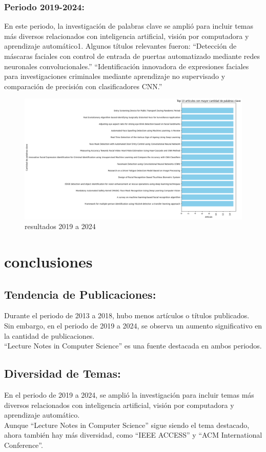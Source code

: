 \documentclass[conference]{IEEEtran}
\begin{document}
\subsubsection{Periodo 2019-2024:}
En este periodo, la investigación de palabras clave se amplió para incluir temas más diversos relacionados con inteligencia artificial, visión por computadora y aprendizaje automático1.
Algunos títulos relevantes fueron:
“Detección de máscaras faciales con control de entrada de puertas automatizado mediante redes neuronales convolucionales.”
“Identificación innovadora de expresiones faciales para investigaciones criminales mediante aprendizaje no supervisado y comparación de precisión con clasificadores CNN.”
\begin{figure}[H]
    \centering
    \includegraphics[width=1\linewidth]{palabrasclavetitulos2019.png}
    \caption{resultados 2019 a 2024}
    \label{fig:enter-label}
\end{figure}


\section{conclusiones}

\subsection{Tendencia de Publicaciones:}
Durante el periodo de 2013 a 2018, hubo menos artículos o títulos publicados.\\
Sin embargo, en el periodo de 2019 a 2024, se observa un aumento significativo en la cantidad de publicaciones.\\
“Lecture Notes in Computer Science” es una fuente destacada en ambos periodos.

\subsection{Diversidad de Temas:}
En el periodo de 2019 a 2024, se amplió la investigación para incluir temas más diversos relacionados con inteligencia artificial, visión por computadora y aprendizaje automático.\\
Aunque “Lecture Notes in Computer Science” sigue siendo el tema destacado, ahora también hay más diversidad, como “IEEE ACCESS” y “ACM International Conference”.
\end{document}
